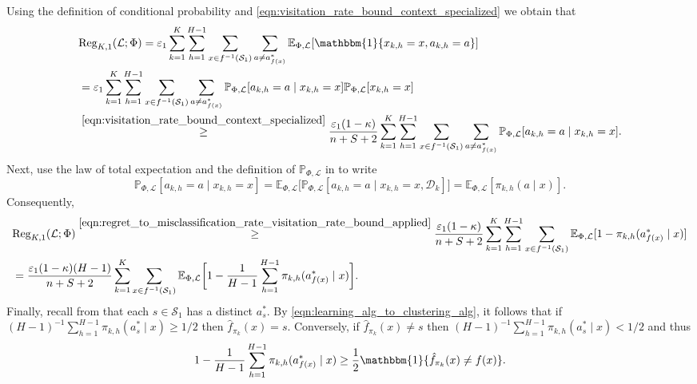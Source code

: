 \documentclass[11pt]{article}
\newcommand{\mcD}{\mathcal{D}}
\newcommand{\mcL}{\mathcal{L}}
\newcommand{\mcS}{\mathcal{S}}
\newcommand{\mbbP}{\mathbb{P}}
\newcommand{\mbbE}{\mathbb{E}}
\newcommand{\reg}{\textnormal{Reg}}
\theoremstyle{definition}
\theoremstyle{definition}
\begin{document}
Using the definition of conditional probability and \eqref{eqn:visitation_rate_bound_context_specialized} we obtain that
\begin{align}
	 &
	\reg_{K,1}(\mcL;\Phi)
	=
	\varepsilon_1
	\sum_{k=1}^K
	\sum_{h=1}^{H-1}
	\sum_{x\in f^{-1}(\mcS_1)}
	\sum_{a\neq a^*_{f(x)}}
	\mbbE_{\Phi,\mcL}[\mathbbm{1}\{x_{k,h}=x,a_{k,h}=a\}]
	\nonumber
	\\
	 &
	=
	\varepsilon_1
	\sum_{k=1}^K
	\sum_{h=1}^{H-1}
	\sum_{x\in f^{-1}(\mcS_1)}
	\sum_{a\neq a^*_{f(x)}}
	\mbbP_{\Phi,\mcL}[a_{k,h}=a\mid x_{k,h}=x]\mbbP_{\Phi,\mcL}[x_{k,h}=x ]
	\nonumber
	\\
	 &
	\overset{\eqref{eqn:visitation_rate_bound_context_specialized}}{\geq}
	\frac{\varepsilon_1(1-\kappa)}{n+S+2}
	\sum_{k=1}^K
	\sum_{h=1}^{H-1}
	\sum_{x\in f^{-1}(\mcS_1)}
	\sum_{a\neq a^*_{f(x)}}
	\mbbP_{\Phi,\mcL}[a_{k,h}=a\mid x_{k,h}=x]
	.
	\label{eqn:regret_to_misclassification_rate_visitation_rate_bound_applied}
\end{align}
Next, use the law of total expectation and the definition of $\mbbP_{\Phi,\mcL}$ in  to write
\begin{equation}
	\mbbP_{\Phi,\mcL}[a_{k,h}=a\mid x_{k,h}=x]
	=
	\mbbE_{\Phi,\mcL}\bigl[\mbbP_{\Phi,\mcL}[a_{k,h}=a\mid x_{k,h}=x,\mcD_k]\bigr]
	=
	\mbbE_{\Phi,\mcL}[\pi_{k,h}(a\mid x)]
	.
\end{equation}
Consequently,
\begin{align}
	 &
	\reg_{K,1}(\mcL;\Phi)
	\overset{\eqref{eqn:regret_to_misclassification_rate_visitation_rate_bound_applied}}{\geq}
	\frac{\varepsilon_1(1-\kappa)}{n+S+2}
	\sum_{k=1}^K
	\sum_{h=1}^{H-1}
	\sum_{x\in f^{-1}(\mcS_1)}
	\mbbE_{\Phi,\mcL}[ 1 - \pi_{k,h}(a_{f(x)}^*\mid x)]
	\nonumber
	\\
	 &
	=
	\frac{\varepsilon_1(1-\kappa)(H-1)}{n+S+2}
	\sum_{k=1}^K
	\sum_{x\in f^{-1}(\mcS_1)}
	\mbbE_{\Phi,\mcL}\biggl[1-\frac{1}{H-1}\sum_{h=1}^{H-1}\pi_{k,h}(a_{f(x)}^*\mid x)\biggr]
	.
\end{align}
Finally, recall from  that each $s\in\mcS_1$ has a distinct $a_s^*$.
By \eqref{eqn:learning_alg_to_clustering_alg}, it follows that if $(H-1)^{-1}\sum_{h=1}^{H-1} \allowbreak \pi_{k,h}(a_{s}^*\mid x)\geq 1/2$ then $\hat{f}_{\pi_k}(x) = s$.
Conversely, if $\hat{f}_{\pi_k}(x) \neq s$ then $(H-1)^{-1}\sum_{h=1}^{H-1} \allowbreak \pi_{k,h}(a_{s}^*\mid x)< 1/2$ and thus
\begin{equation}
	\label{eqn:bound_on_how_often_wrong_action_is_selected}
	1
	-
	\frac{1}{H-1}\sum_{h=1}^{H-1}\allowbreak \pi_{k,h}(a_{f(x)}^*\mid x)
	\geq
	\frac{1}{2}\mathbbm{1}\{\hat{f}_{\pi_k}(x)\neq f(x)\}
	.
\end{equation}
\end{document}
